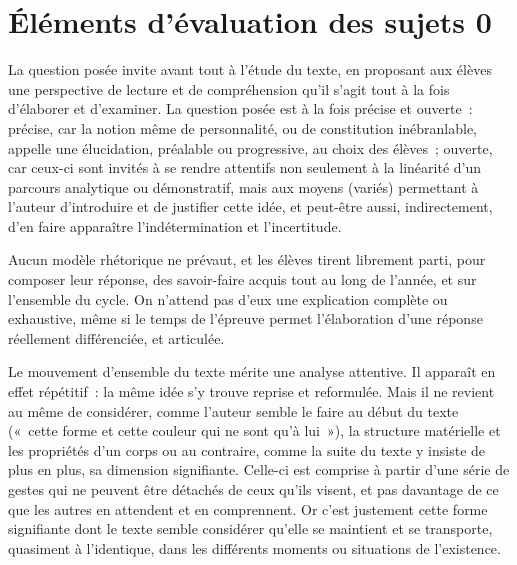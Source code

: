 \chapter*{Éléments d'évaluation des sujets 0}

{La question posée invite avant tout à l'étude du texte, en proposant aux élèves une
perspective de lecture et de compréhension qu'il s'agit tout à la fois d'élaborer et
d'examiner. La question posée est à la fois précise et ouverte~: précise, car la notion
même de personnalité, ou de constitution inébranlable, appelle une élucidation,
préalable ou progressive, au choix des élèves~; ouverte, car ceux-ci sont invités à se
rendre attentifs non seulement à la linéarité d'un parcours analytique ou démonstratif,
mais aux moyens (variés) permettant à l'auteur d'introduire et de justifier cette idée, et
peut-être aussi, indirectement, d'en faire apparaître l'indétermination et l'incertitude.

Aucun modèle rhétorique ne prévaut, et les élèves tirent librement parti, pour
composer leur réponse, des savoir-faire acquis tout au long de l'année, et sur
l'ensemble du cycle. On n'attend pas d'eux une explication complète ou exhaustive,
même si le temps de l'épreuve permet l'élaboration d'une réponse réellement
différenciée, et articulée.

Le mouvement d'ensemble du texte mérite une analyse attentive. Il apparaît en effet
répétitif~: la même idée s'y trouve reprise et reformulée. Mais il ne revient au même
de considérer, comme l'auteur semble le faire au début du texte («~cette forme et
cette couleur qui ne sont qu'à lui~»), la structure matérielle et les propriétés d'un
corps ou au contraire, comme la suite du texte y insiste de plus en plus, sa dimension
signifiante. Celle-ci est comprise à partir d'une série de gestes qui ne peuvent être
détachés de ceux qu'ils visent, et pas davantage de ce que les autres en attendent
et en comprennent. Or c'est justement cette forme signifiante dont le texte semble
considérer qu'elle se maintient et se transporte, quasiment à l'identique, dans les
différents moments ou situations de l'existence.

}
